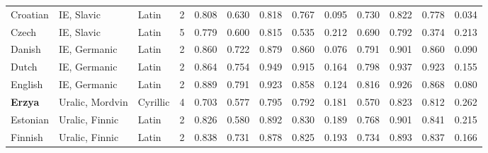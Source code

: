 \begin{tabular}{lllrrrrrrrrrr}
                       Croatian &                      IE, Slavic &      Latin &         2 &                       0.808 &                         0.630 &         0.818 &                  0.767 &            0.095 &                         0.730 &         0.822 &                  0.778 &            0.034 \\
                          Czech &                      IE, Slavic &      Latin &         5 &                       0.779 &                         0.600 &         0.815 &                  0.535 &            0.212 &                         0.690 &         0.792 &                  0.374 &            0.213 \\
                         Danish &                    IE, Germanic &      Latin &         2 &                       0.860 &                         0.722 &         0.879 &                  0.860 &            0.076 &                         0.791 &         0.901 &                  0.860 &            0.090 \\
                          Dutch &                    IE, Germanic &      Latin &         2 &                       0.864 &                         0.754 &         0.949 &                  0.915 &            0.164 &                         0.798 &         0.937 &                  0.923 &            0.155 \\
                        English &                    IE, Germanic &      Latin &         2 &                       0.889 &                         0.791 &         0.923 &                  0.858 &            0.124 &                         0.816 &         0.926 &                  0.868 &            0.080 \\
                 \textbf{Erzya} &                 Uralic, Mordvin &   Cyrillic &         4 &                       0.703 &                         0.577 &         0.795 &                  0.792 &            0.181 &                         0.570 &         0.823 &                  0.812 &            0.262 \\
                       Estonian &                  Uralic, Finnic &      Latin &         2 &                       0.826 &                         0.580 &         0.892 &                  0.830 &            0.189 &                         0.768 &         0.901 &                  0.841 &            0.215 \\
                        Finnish &                  Uralic, Finnic &      Latin &         2 &                       0.838 &                         0.731 &         0.878 &                  0.825 &            0.193 &                         0.734 &         0.893 &                  0.837 &            0.166 \\

\end{tabular}
